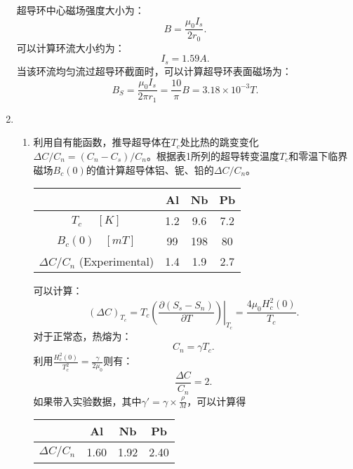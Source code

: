 \documentclass[reqno,a4paper,12pt]{amsart}
\begin{document}
\begin{enumerate}[1.]
\begin{tcolorbox}[breakable, colback = black!5!white, colframe = black]
超导环中心磁场强度大小为：
\[
	B = \frac{\mu_0 I_s}{2r_0}.
\]
可以计算环流大小约为：
\[
	I_s = 1.59A.
\]
当该环流均匀流过超导环截面时，可以计算超导环表面磁场为：
\[
	B_S = \frac{\mu_0 I_s}{2\pi r_1} = \frac{10}{\pi} B = 3.18 \times 10^{-3} T.
\]
\end{tcolorbox}

\item 
\begin{enumerate}
	\item 利用自有能函数，推导超导体在$T_c$处比热的跳变变化$\Delta C/C_n = (C_n-C_s)/C_n$。根据表1所列的超导转变温度$T_c$和零温下临界磁场$B_c(0)$的值计算超导体铝、铌、铅的$\Delta C/C_n$。
	\begin{table}[h!]
	\centering
	\begin{tabular}{|c|c|c|c|}
		\hline
		{} & Al & Nb & Pb \\ \hline
		$T_c \ \ \ \ \ \ [K]$ & 1.2 & 9.6 & 7.2 \\
		$B_c(0) \ \ \ \ [mT]$ & 99 & 198 & 80 \\
		$\Delta C/C_n$ (Experimental) & 1.4 & 1.9 & 2.7 \\ \hline
	\end{tabular}
	\label{表1}
	\end{table}
	\begin{tcolorbox}[breakable, colback = black!5!white, colframe = black]
	可以计算：
	\[
		(\Delta C)_{T_c} = T_c \left. \left( \frac{\partial (S_s - S_n)}{\partial T} \right) \right\vert_{T_c} = \frac{4\mu_0 H_c^2(0)}{T_c}.
	\]
	对于正常态，热熔为：
	\[
		C_n = \gamma T_c.
	\]
	利用$\frac{H_c^2(0)}{T_c^2} = \frac{\gamma}{2\mu_0}$则有：
	\[
		\frac{\Delta C}{C_n} = 2.
	\]
	如果带入实验数据，其中$\gamma' = \gamma \times \frac{\rho}{M}$，可以计算得
	\begin{table}[H]
	\centering
	\begin{tabular}{|c|c|c|c|}
		\hline
		{} & Al & Nb & Pb \\ \hline
		$\Delta C/C_n$ & {1.60} & {1.92} & {2.40} \\ 
		\hline
	\end{tabular}
	\end{table}
	\end{tcolorbox}
	

\end{enumerate}
\end{enumerate}
\end{document}
